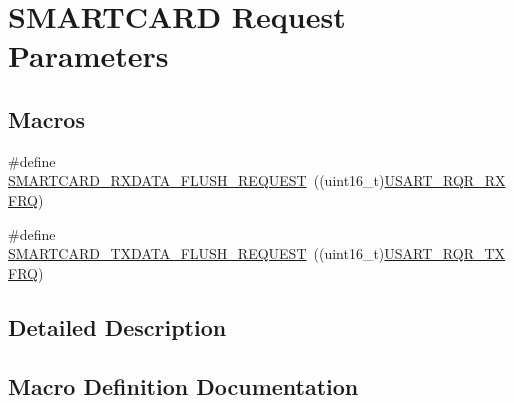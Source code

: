 \hypertarget{group___s_m_a_r_t_c_a_r_d___request___parameters}{}\section{S\+M\+A\+R\+T\+C\+A\+RD Request Parameters}
\label{group___s_m_a_r_t_c_a_r_d___request___parameters}
\subsection*{Macros}
\begin{DoxyCompactItemize}
\item 
\#define \hyperlink{group___s_m_a_r_t_c_a_r_d___request___parameters_ga99f5bbd7c32c09d0fc84ad4ec58bde26}{S\+M\+A\+R\+T\+C\+A\+R\+D\+\_\+\+R\+X\+D\+A\+T\+A\+\_\+\+F\+L\+U\+S\+H\+\_\+\+R\+E\+Q\+U\+E\+ST}~((uint16\+\_\+t)\hyperlink{group___peripheral___registers___bits___definition_ga7b148ee7c697bbcf836648063613612a}{U\+S\+A\+R\+T\+\_\+\+R\+Q\+R\+\_\+\+R\+X\+F\+RQ})
\item 
\#define \hyperlink{group___s_m_a_r_t_c_a_r_d___request___parameters_gab3fdde978ae746d718250e3c29b4e39d}{S\+M\+A\+R\+T\+C\+A\+R\+D\+\_\+\+T\+X\+D\+A\+T\+A\+\_\+\+F\+L\+U\+S\+H\+\_\+\+R\+E\+Q\+U\+E\+ST}~((uint16\+\_\+t)\hyperlink{group___peripheral___registers___bits___definition_gaa40d2e52b5955b30c9399eb3dec769e8}{U\+S\+A\+R\+T\+\_\+\+R\+Q\+R\+\_\+\+T\+X\+F\+RQ})
\end{DoxyCompactItemize}


\subsection{Detailed Description}


\subsection{Macro Definition Documentation}
\mbox{\label{group___s_m_a_r_t_c_a_r_d___request___parameters_ga99f5bbd7c32c09d0fc84ad4ec58bde26}} 
